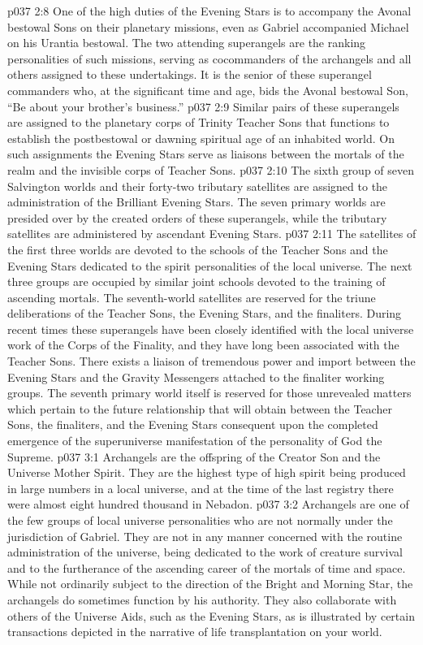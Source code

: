 \vs p037 2:8 One of the high duties of the Evening Stars is to accompany the Avonal bestowal Sons on their planetary missions, even as Gabriel accompanied Michael on his Urantia bestowal. The two attending superangels are the ranking personalities of such missions, serving as cocommanders of the archangels and all others assigned to these undertakings. It is the senior of these superangel commanders who, at the significant time and age, bids the Avonal bestowal Son, “Be about your brother’s business.”
\vs p037 2:9 Similar pairs of these superangels are assigned to the planetary corps of Trinity Teacher Sons that functions to establish the postbestowal or dawning spiritual age of an inhabited world. On such assignments the Evening Stars serve as liaisons between the mortals of the realm and the invisible corps of Teacher Sons.
\pc \vs p037 2:10  The sixth group of seven Salvington worlds and their forty\hyp{}two tributary satellites are assigned to the administration of the Brilliant Evening Stars. The seven primary worlds are presided over by the created orders of these superangels, while the tributary satellites are administered by ascendant Evening Stars.
\vs p037 2:11 The satellites of the first three worlds are devoted to the schools of the Teacher Sons and the Evening Stars dedicated to the spirit personalities of the local universe. The next three groups are occupied by similar joint schools devoted to the training of ascending mortals. The seventh\hyp{}world satellites are reserved for the triune deliberations of the Teacher Sons, the Evening Stars, and the finaliters. During recent times these superangels have been closely identified with the local universe work of the Corps of the Finality, and they have long been associated with the Teacher Sons. There exists a liaison of tremendous power and import between the Evening Stars and the Gravity Messengers attached to the finaliter working groups. The seventh primary world itself is reserved for those unrevealed matters which pertain to the future relationship that will obtain between the Teacher Sons, the finaliters, and the Evening Stars consequent upon the completed emergence of the superuniverse manifestation of the personality of God the Supreme.\plusone
{}
\vs p037 3:1 Archangels are the offspring of the Creator Son and the Universe Mother Spirit. They are the highest type of high spirit being produced in large numbers in a local universe, and at the time of the last registry there were almost eight hundred thousand in Nebadon.
\vs p037 3:2 Archangels are one of the few groups of local universe personalities who are not normally under the jurisdiction of Gabriel. They are not in any manner concerned with the routine administration of the universe, being dedicated to the work of creature survival and to the furtherance of the ascending career of the mortals of time and space. While not ordinarily subject to the direction of the Bright and Morning Star, the archangels do sometimes function by his authority. They also collaborate with others of the Universe Aids, such as the Evening Stars, as is illustrated by certain transactions depicted in the narrative of life transplantation on your world.
